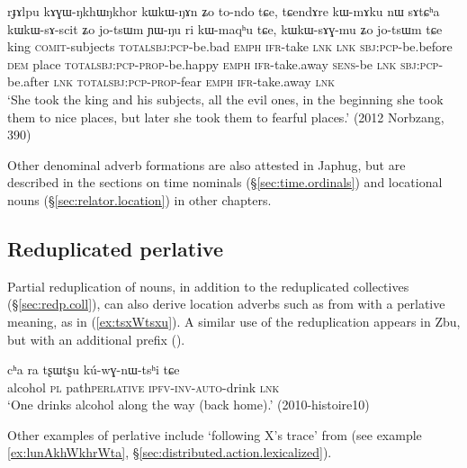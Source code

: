 \begin{exe}
\ex \label{ex:kAGWNkhWNkhor}
\gll rɟɤlpu kɤɣɯ-ŋkhɯ\tld{}ŋkhor kɯ\tld{}kɯ-ŋɤn ʑo to-ndo tɕe, tɕendɤre kɯ-mɤku nɯ sɤtɕʰa kɯ\tld{}kɯ-sɤ-scit ʑo jo-tsɯm ɲɯ-ŋu ri kɯ-maqʰu tɕe, kɯ\tld{}kɯ-sɤɣ-mu ʑo jo-tsɯm tɕe \\
king \textsc{comit}-subjects \textsc{total}\tld{}\textsc{sbj}:\textsc{pcp}-be.bad \textsc{emph} \textsc{ifr}-take \textsc{lnk}  \textsc{lnk} \textsc{sbj}:\textsc{pcp}-be.before \textsc{dem} place \textsc{total}\tld{}\textsc{sbj}:\textsc{pcp}-\textsc{prop}-be.happy \textsc{emph} \textsc{ifr}-take.away \textsc{sens}-be \textsc{lnk} \textsc{sbj}:\textsc{pcp}-be.after \textsc{lnk} \textsc{total}\tld{}\textsc{sbj}:\textsc{pcp}-\textsc{prop}-fear \textsc{emph} \textsc{ifr}-take.away \textsc{lnk} \\
\glt `She took the king and his subjects, all the evil ones, in the beginning she took them to nice places, but later she took them to fearful places.' (2012 Norbzang, 390)
\end{exe}

Other denominal adverb formations are also attested in Japhug, but are described in the sections on time nominals (§\ref{sec:time.ordinals}) and locational nouns (§\ref{sec:relator.location}) in other chapters.

 
 \subsection{Reduplicated perlative} \label{sec:perlative}
Partial reduplication of nouns, in addition to the reduplicated collectives (§\ref{sec:redp.coll}), can also derive location adverbs such as  from  with a perlative meaning, as in (\ref{ex:tsxWtsxu}). A similar use of the reduplication appears in Zbu, but with an additional  prefix (\citealt[114]{gong18these}).

\begin{exe}
\ex \label{ex:tsxWtsxu}
\gll cʰa ra tʂɯ\redp{}tʂu kú-wɣ-nɯ-tsʰi tɕe \\
alcohol \textsc{pl} path\redp{}\textsc{perlative}  \textsc{ipfv}-\textsc{inv}-\textsc{auto}-drink \textsc{lnk} \\
\glt `One drinks alcohol along the way (back home).' (2010-histoire10)
\end{exe}

Other examples of perlative include  `following X's trace' from  (see example \ref{ex:lunAkhWkhrWta}, §\ref{sec:distributed.action.lexicalized}).

